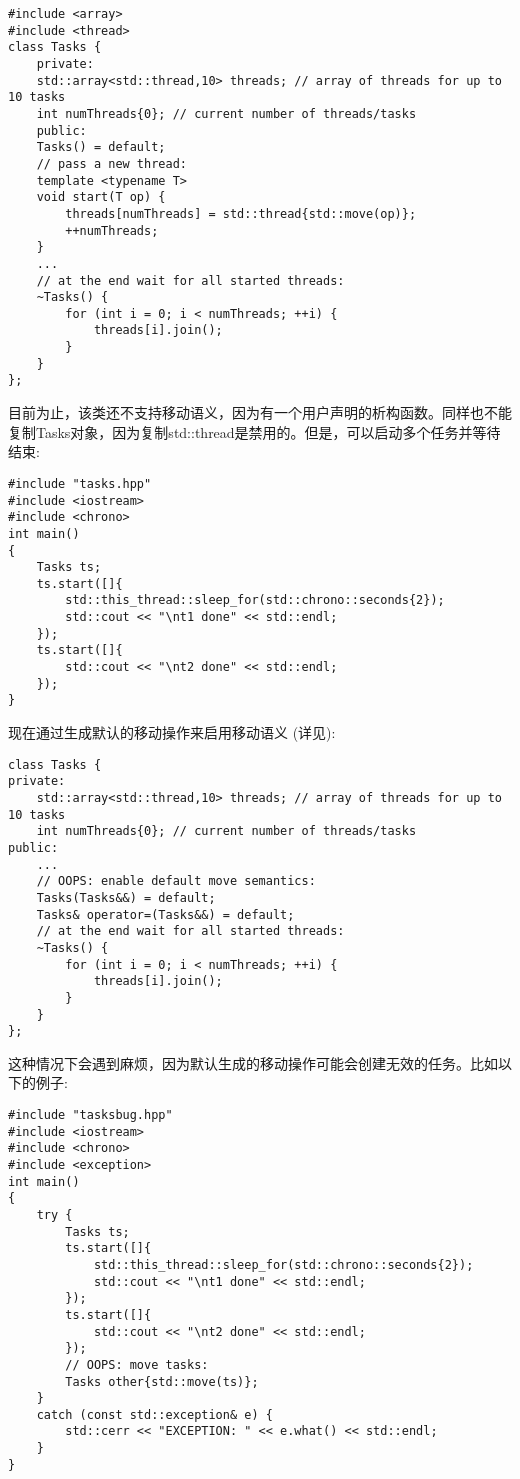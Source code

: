 {\color{red}{basics/tasks.hpp}}\par

\begin{lstlisting}[caption={}]
#include <array>
#include <thread>
class Tasks {
	private:
	std::array<std::thread,10> threads; // array of threads for up to 10 tasks
	int numThreads{0}; // current number of threads/tasks
	public:
	Tasks() = default;
	// pass a new thread:
	template <typename T>
	void start(T op) {
		threads[numThreads] = std::thread{std::move(op)};
		++numThreads;
	}
	...
	// at the end wait for all started threads:
	~Tasks() {
		for (int i = 0; i < numThreads; ++i) {
			threads[i].join();
		}
	}
};
\end{lstlisting}

目前为止，该类还不支持移动语义，因为有一个用户声明的析构函数。同样也不能复制Tasks对象，因为复制std::thread是禁用的。但是，可以启动多个任务并等待结束:\par

{\color{red}{basics/tasks.cpp}}\par

\begin{lstlisting}[caption={}]
#include "tasks.hpp"
#include <iostream>
#include <chrono>
int main()
{
	Tasks ts;
	ts.start([]{
		std::this_thread::sleep_for(std::chrono::seconds{2});
		std::cout << "\nt1 done" << std::endl;
	});
	ts.start([]{
		std::cout << "\nt2 done" << std::endl;
	});
}
\end{lstlisting}

现在通过生成默认的移动操作来启用移动语义
(详见{\color{red}{basics/tasksbug.cpp}}):\par

\begin{lstlisting}[caption={}]
class Tasks {
private:
	std::array<std::thread,10> threads; // array of threads for up to 10 tasks
	int numThreads{0}; // current number of threads/tasks
public:
	...
	// OOPS: enable default move semantics:
	Tasks(Tasks&&) = default;
	Tasks& operator=(Tasks&&) = default;
	// at the end wait for all started threads:
	~Tasks() {
		for (int i = 0; i < numThreads; ++i) {
			threads[i].join();
		}
	}
};
\end{lstlisting}

这种情况下会遇到麻烦，因为默认生成的移动操作可能会创建无效的任务。比如以下的例子:\par

{\color{red}{basics/tasksbug.cpp}}\par

\begin{lstlisting}[caption={}]
#include "tasksbug.hpp"
#include <iostream>
#include <chrono>
#include <exception>
int main()
{
	try {
		Tasks ts;
		ts.start([]{
			std::this_thread::sleep_for(std::chrono::seconds{2});
			std::cout << "\nt1 done" << std::endl;
		});
		ts.start([]{
			std::cout << "\nt2 done" << std::endl;
		});
		// OOPS: move tasks:
		Tasks other{std::move(ts)};
	}
	catch (const std::exception& e) {
		std::cerr << "EXCEPTION: " << e.what() << std::endl;
	}
}
\end{lstlisting}

